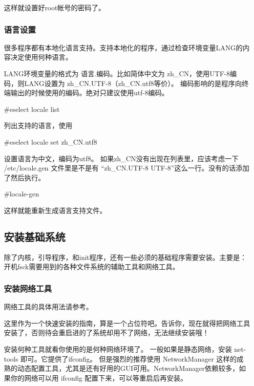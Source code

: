 这样就设置好root帐号的密码了。

\subsubsection{语言设置}\label{sec:lang}

很多程序都有本地化语言支持。支持本地化的程序，通过检查环境变量LANG的内容决定使用何种语言。

LANG环境变量的格式为 语言.编码。比如简体中文为 zh\_CN，使用UTF-8编码，则LANG设置为 zh\_CN.UTF-8（zh\_CN.utf8等价）。
编码影响的是程序向终端输出的时候使用的编码。绝对只建议使用utf-8编码。

\begin{code}
\#eselect locale list
\end{code}

列出支持的语言，使用

\begin{code}
\#eselect locale set zh\_CN.utf8
\end{code}

设置语言为中文，编码为utf8。
如果zh\_CN没有出现在列表里，应该考虑一下 /etc/locale.gen 文件里是不是有
``zh\_CN.UTF-8 UTF-8''这么一行。没有的话添加了然后执行。

\begin{code}
\#locale-gen
\end{code}

这样就能重新生成语言支持文件。

\subsection{安装基础系统}

除了内核，引导程序，和init程序，还有一些必须的基础程序需要安装。主要是：开机fsck需要用到的各种文件系统的辅助工具和网络工具。

\subsubsection{安装网络工具}

网络工具的具体用法请参考。

这里作为一个快速安装的指南，算是一个占位符吧。告诉你，现在就得把网络工具安装了，否则待会重启进的了系统却用不了网络，无法继续安装哦！

安装何种工具就看你使用的是何种网络环境了。
一般如果是静态网络，安装 net-tools 即可。它提供了ifconfig。
但是强烈的推荐使用 NetworkManager 这样的成熟的动态配置工具，尤其是还有好用的GUI可用。NetworkManager依赖较多，如果你的网络可以用 ifconfig 配置下来，可以等重启后再安装。

